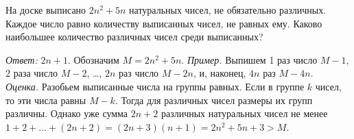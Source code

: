 \problem
На доске выписано $2 n^2 + 5 n$ натуральных чисел, не обязательно различных.
Каждое число равно количеству выписанных чисел, не равных ему.
Каково наибольшее количество различных чисел среди выписанных?

\solution
\emph{Ответ:} $2 n + 1 $.
Обозначим $M = 2 n^2 + 5 n$.
\emph{Пример.}
Выпишем 1 раз число $M - 1$, 2 раза число $M - 2$, \ldots, $2 n$ раз число
$M - 2 n$, и, наконец, $4 n$ раз $M - 4 n$.
\\
\emph{Оценка.}
Разобьем выписанные числа на группы равных.
Если в группе $k$ чисел, то эти числа равны $M - k$.
Тогда для различных чисел размеры их групп различны.
Однако уже сумма $2 n + 2$ различных натуральных чисел не менее
$1 + 2 + \ldots + (2 n + 2) = (2 n + 3) (n + 1) = 2 n^2 + 5 n + 3 > M$. 
\endproblem
